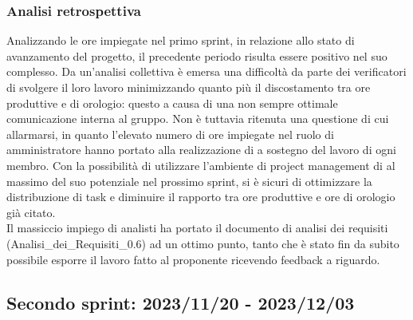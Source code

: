 \newpage
\subsubsection{Analisi retrospettiva}
Analizzando le ore impiegate nel primo sprint, in relazione allo stato di avanzamento del progetto, il precedente periodo risulta essere positivo nel suo complesso. Da un'analisi collettiva è emersa una difficoltà da parte dei verificatori di svolgere il loro lavoro minimizzando quanto più il discostamento tra ore produttive e di orologio: questo a causa di una non sempre ottimale comunicazione interna al gruppo. Non è tuttavia ritenuta una questione di cui allarmarsi, in quanto l'elevato numero di ore impiegate nel ruolo di amministratore hanno portato alla realizzazione di  a sostegno del lavoro di ogni membro. Con la possibilità di utilizzare l'ambiente di project management di  al massimo del suo potenziale nel prossimo sprint, si è sicuri di ottimizzare la distribuzione di task e diminuire il rapporto tra ore produttive e ore di orologio già citato.\\
Il massiccio impiego di analisti ha portato il documento di analisi dei requisiti (Analisi\_dei\_Requisiti\_0.6) ad un ottimo punto, tanto che è stato fin da subito possibile esporre il lavoro fatto al proponente ricevendo feedback a riguardo.
\newpage

\subsection{Secondo sprint: 2023/11/20 - 2023/12/03}

